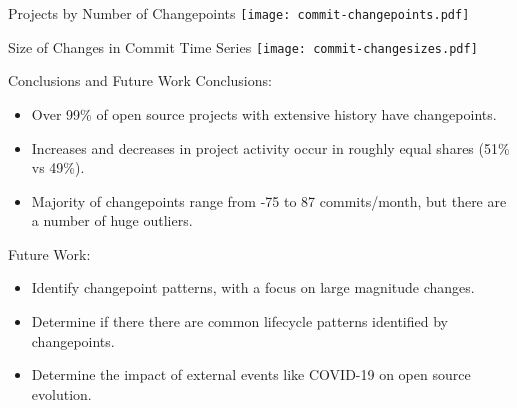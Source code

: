 \documentclass[11pt,handout]{beamer}
\begin{document}
\begin{frame}{Projects by Number of Changepoints}
    \texttt{[image: commit-changepoints.pdf]}
\end{frame}

\begin{frame}{Size of Changes in Commit Time Series}
    \texttt{[image: commit-changesizes.pdf]}
\end{frame}

\begin{frame}{Conclusions and Future Work}
    Conclusions:
    \begin{itemize}
        \item Over 99\% of open source projects with extensive history have changepoints.
        \item Increases and decreases in project activity occur in roughly equal shares (51\% vs 49\%).
        \item Majority of changepoints range from -75 to 87 commits/month, but there are a number of huge outliers.
    \end{itemize}
    Future Work:
    \begin{itemize}
        \item Identify changepoint patterns, with a focus on large magnitude changes.
        \item Determine if there there are common lifecycle patterns identified by changepoints.
        \item Determine the impact of external events like COVID-19 on open source evolution.
    \end{itemize}
\end{frame}
\end{document}
